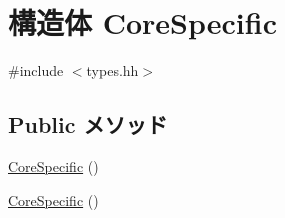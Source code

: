 \hypertarget{structMipsISA_1_1CoreSpecific}{
\section{構造体 CoreSpecific}
\label{structMipsISA_1_1CoreSpecific}
}


{\ttfamily \#include $<$types.hh$>$}\subsection*{Public メソッド}
\begin{DoxyCompactItemize}
\item 
\hyperlink{structMipsISA_1_1CoreSpecific_a45dbdf6d2612a6d836210996f77d89f8}{CoreSpecific} ()
\item 
\hyperlink{structMipsISA_1_1CoreSpecific_a45dbdf6d2612a6d836210996f77d89f8}{CoreSpecific} ()
\end{DoxyCompactItemize}
